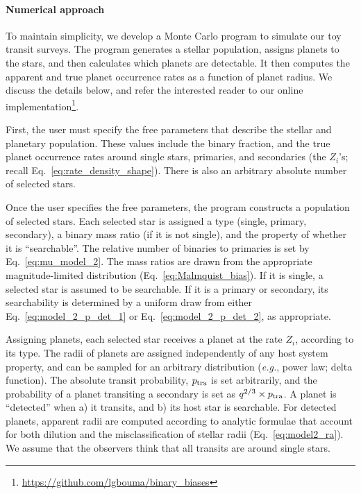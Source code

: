 \paragraph{Numerical approach}
To maintain simplicity, we develop a Monte Carlo program to simulate our 
toy transit surveys.
The program generates a stellar population, assigns planets to the stars, and 
then calculates which planets are detectable.
It then computes the apparent and true planet occurrence rates as a function 
of planet radius.
We discuss the details below, and refer the interested reader to our online 
implementation\footnote{\url{https://github.com/lgbouma/binary_biases}}.

First, the user must specify the free parameters that describe the 
stellar and planetary population. These values include the binary fraction, 
and the true planet occurrence rates around single stars, primaries, and 
secondaries (the $Z_i$'s; recall Eq.~\ref{eq:rate_density_shape}).
There is also an arbitrary absolute number of selected stars.

Once the user specifies the free parameters, the program constructs a 
population of selected stars.
Each selected star is assigned a type (single, primary, secondary), a 
binary mass ratio (if it is not single), and the property of whether it is 
``searchable''.
The relative number of binaries to primaries is set by 
Eq.~\ref{eq:mu_model_2}.
The mass ratios are drawn from the appropriate magnitude-limited distribution 
(Eq.~\ref{eq:Malmquist_bias}).
If it is single, a selected star is assumed to be searchable.
If it is a primary or secondary, its searchability is determined by a uniform 
draw from either Eq.~\ref{eq:model_2_p_det_1} or Eq.~\ref{eq:model_2_p_det_2}, 
as appropriate. 

Assigning planets, each selected star receives a planet at the rate $Z_i$, 
according to its type.
The radii of planets are assigned independently of any host system property, 
and can be sampled for an arbitrary distribution ({\it e.g.}, power law; delta 
function).
The absolute transit probability, $p_{\rm tra}$ is set arbitrarily, and the 
probability of a planet transiting a secondary is set as $q^{2/3}\times p_{\rm 
tra}$.
A planet is ``detected'' when a) it transits, and b) its host star is 
searchable.
For detected planets, apparent radii are computed according to analytic 
formulae that account for both dilution and the misclassification of stellar 
radii (Eq.~\ref{eq:model2_ra}).
We assume that the observers think that all transits are around single stars.

